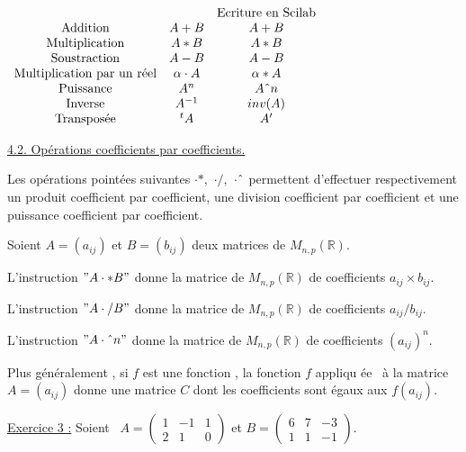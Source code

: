 \documentclass{article}
\begin{document}
$%
\begin{array}{ccc}
&  & \text{Ecriture en Scilab} \\ 
\text{Addition} & A+B & A+B \\ 
\text{Multiplication} & A\ast B & A\ast B \\ 
\text{Soustraction} & A-B & A-B \\ 
\text{Multiplication par un r\'{e}el} & \alpha \cdot A & \alpha \ast A \\ 
\text{Puissance} & A^{n} & A\symbol{94}n \\ 
\text{Inverse} & A^{-1} & inv(A) \\ 
\text{Transpos\'{e}e} & ^{t}A & A^{\prime }%
\end{array}%
$

\underline{4.2. Op\'{e}rations coefficients par coefficients.}

Les op\'{e}rations point\'{e}es suivantes $\cdot \ast ,$ $\cdot /,$ $\cdot 
\symbol{94}$ permettent d'effectuer respectivement un produit coefficient
par coefficient, une division coefficient par coefficient et une puissance
coefficient par coefficient.

Soient $A=(a_{ij})$ et $B=(b_{ij})$ deux matrices de $M_{n,p}(%
\mathbb{R}
).$

L'instruction $"A\cdot \ast B"$ donne la matrice de $M_{n,p}(%
\mathbb{R}
)$ de coefficients $a_{ij}\times b_{ij}.$

L'instruction $"A\cdot /B"$ donne la matrice de $M_{n,p}(%
\mathbb{R}
)$ de coefficients $a_{ij}/b_{ij}.$

L'instruction $"A\cdot \symbol{94}n"$ donne la matrice de $M_{n,p}(%
\mathbb{R}
)$ de coefficients $\left( a_{ij}\right) ^{n}.$

Plus g\'{e}n\'{e}ralement , si $f$ est une fonction , la fonction $f$ appliqu%
\'{e}e \ \`{a} la matrice $A=(a_{ij})$ donne une matrice $C$ dont les
coefficients sont \'{e}gaux aux $f(a_{ij}).$

\underline{Exercice 3 :} Soient \ $A=\left( 
\begin{array}{ccc}
1 & -1 & 1 \\ 
2 & 1 & 0%
\end{array}%
\right) $ et $B=\left( 
\begin{array}{ccc}
6 & 7 & -3 \\ 
1 & 1 & -1%
\end{array}%
\right) .$
\end{document}
